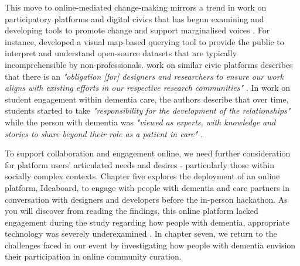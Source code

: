 This move to online-mediated change-making mirrors a trend in work on participatory platforms and digital civics that has begun examining and developing tools to promote change and support marginalised voices \citep{corbett_exploring_2018}. For instance, \cite{puussaar_making_2018} developed a visual map-based querying tool to provide the public to interpret and understand open-source datasets that are typically incomprehensible by non-professionals. \cite{asad_tap_2017} work on similar civic platforms describes that there is an \textit{"obligation [for] designers and researchers to ensure our work aligns with existing efforts in our respective research communities" \citep[pg. 6314]{asad_tap_2017}}. In \cite{foley_student_2020} work on student engagement within dementia care, the authors describe that over time, students started to take \textit{"responsibility for the development of the relationships"} while the person with dementia was \textit{"viewed as experts, with knowledge and stories to share beyond their role as a patient in care" \citep[pg. 9]{foley_student_2020}}. 

To support collaboration and engagement online, we need further consideration for platform users’ articulated needs and desires - particularly those within socially complex contexts. Chapter five explores the deployment of an online platform, Ideaboard, to engage with people with dementia and care partners in conversation with designers and developers before the in-person hackathon. As you will discover from reading the findings, this online platform lacked engagement during the study regarding how people with dementia, appropriate technology was severely underexamined \citep{lindqvist2018contrasting}. In chapter seven, we return to the challenges faced in our event by investigating how people with dementia envision their participation in online community curation.

